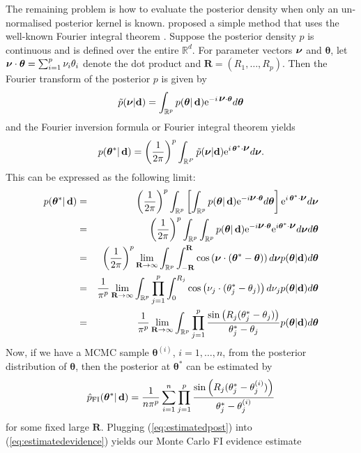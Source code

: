 \documentclass[%
 reprint,
 amsmath,amssymb,
 aps,
]{revtex4-2}
\def\R{\mathbb{R}}
\def\btheta{\boldsymbol{\theta}}
\def\btheta{\boldsymbol{\theta}}
\def\Rbold{\mathbf{R}}
\renewcommand{\d}{{\bf d}}
\newcommand{\btheta}{\mbox{\boldmath $\theta$}}
\newcommand{\bnu}{\mbox{\boldmath $\nu$}}
\newcommand{\e}{{\rm e}}
\begin{document}
The remaining problem is how to evaluate the posterior density when only an un-normalised posterior kernel is known. \cite{rotiroti2022computing} proposed a simple method that uses the well-known  Fourier integral theorem \cite{pristley2005introduction}. Suppose the posterior density $p$ is continuous and is defined over the entire $\R^d$.  For parameter vectors $\bnu$
and $\btheta$, let $\bnu \cdot \btheta=\sum_{i=1}^p \nu_i\theta_i$ denote the dot product and $\Rbold=(R_1,\ldots,R_p)$. Then the Fourier transform of the posterior $p$ is given by
\[
 \tilde{p}(\bnu|\d)=\int_{\R^p} p(\btheta|\,\d) \e^{-i\,\bnu\cdot\btheta} d\btheta 
\]
and the Fourier inversion formula or Fourier integral theorem yields
\[p(\btheta^*|\,\d)= \left(\frac{1}{2\pi}\right)^p \int_{\R^P} \tilde{p}(\bnu|\d)\e^{i\,\btheta^*\cdot\bnu} d\bnu.\]
This can be expressed as the following limit:
\begin{eqnarray*}
p(\btheta^*|\,\d) &=& \left(\frac{1}{2\pi}\right)^p   \int_{\R^p} \left[ \int_{\R^p} p(\btheta|\,\d) \e^{-i \bnu \cdot \btheta} d\btheta\right]
 \e^{i\,\btheta^*\cdot\bnu} d\bnu\\
 &=& \left(\frac{1}{2\pi}\right)^p     \int_{\R^p}  \int_{\R^p} p(\btheta|\,\d) \e^{-i \bnu \cdot \btheta} 
 \e^{i\btheta^*\cdot\bnu} d\bnu d\btheta\\
 &=& \left(\frac{1}{2\pi}\right)^p    \lim_{\Rbold\rightarrow \infty} \int_{\R^p}  \int_{-\Rbold}^{\Rbold} \cos\left(\bnu\cdot(\btheta^*-\btheta) \right)d\bnu p(\btheta|\d)   d\btheta\\
 &=& \frac{1}{\pi^p}   \lim_{\Rbold\rightarrow \infty} \int_{\R^p}  \prod_{j=1}^p \int_{0}^{R_j} \cos\left(\nu_j\cdot(\theta_j^*-\theta_j) \right)d\nu_j p(\btheta|\d)   d\btheta\\
 &=& \frac{1}{\pi^p}  \lim_{\Rbold\rightarrow \infty} \int_{\R^p}   \prod_{j=1}^p \frac{\sin\left(R_j(\theta_j^*-\theta_j) \right)}{\theta_j^*-\theta_j} p(\btheta|\d)   d\btheta
\end{eqnarray*}
Now, if we have a MCMC sample $\btheta^{(i)}$, $i=1,\ldots,n$, from the posterior distribution of $\btheta$, then the posterior at $\btheta^*$ can be estimated by
\begin{equation}\label{eq:estimatedpost}
\hat{p}_\text{FI}(\btheta^*|\,\d)=\frac{1}{n\pi^p} \sum_{i=1}^n \prod_{j=1}^p\frac{\sin\left(R_j(\theta_j^*-\theta_j^{(i)}) \right)}{\theta_j^*-\theta_j^{(i)}}
\end{equation}
for some fixed large $\Rbold$.
Plugging (\ref{eq:estimatedpost}) into (\ref{eq:estimatedevidence}) yields our Monte Carlo FI evidence estimate
\end{document}
